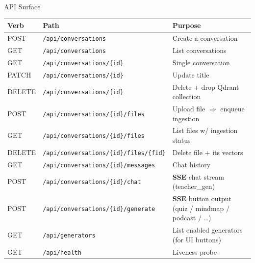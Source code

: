 \documentclass[aspectratio=169, 10pt]{beamer}
\begin{document}
\begin{frame}{API Surface}
  \tiny
  \renewcommand{\arraystretch}{1.15}
  \begin{tabular}{l p{5cm} p{6cm}}
    \toprule
    \rowcolor{eduBlue!20}\textbf{Verb} & \textbf{Path} & \textbf{Purpose} \\
    \midrule
    POST   & \texttt{/api/conversations}                                    & Create a conversation \\
    GET    & \texttt{/api/conversations}                                    & List conversations \\
    GET    & \texttt{/api/conversations/\{id\}}                             & Single conversation \\
    PATCH  & \texttt{/api/conversations/\{id\}}                             & Update title \\
    DELETE & \texttt{/api/conversations/\{id\}}                             & Delete + drop Qdrant collection \\
    POST   & \texttt{/api/conversations/\{id\}/files}                       & Upload file $\Rightarrow$ enqueue ingestion \\
    GET    & \texttt{/api/conversations/\{id\}/files}                       & List files w/ ingestion status \\
    DELETE & \texttt{/api/conversations/\{id\}/files/\{fid\}}               & Delete file + its vectors \\
    GET    & \texttt{/api/conversations/\{id\}/messages}                    & Chat history \\
    POST   & \texttt{/api/conversations/\{id\}/chat}                        & \textbf{SSE} chat stream (teacher\_gen) \\
    POST   & \texttt{/api/conversations/\{id\}/generate}                    & \textbf{SSE} button output (quiz / mindmap / podcast / \dots) \\
    GET    & \texttt{/api/generators}                                       & List enabled generators (for UI buttons) \\
    GET    & \texttt{/api/health}                                           & Liveness probe \\
    \bottomrule
  \end{tabular}
\end{frame}
\end{document}
